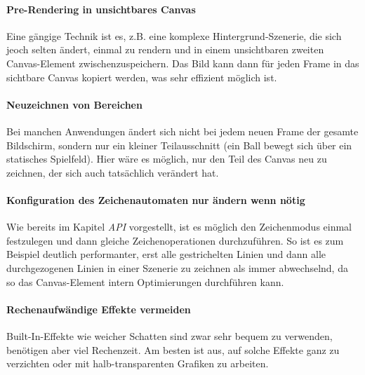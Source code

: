 \documentclass[a4paper, 12pt]{article}
\begin{document}
\paragraph{Pre-Rendering in unsichtbares Canvas} Eine gängige Technik ist es, z.B. eine komplexe Hintergrund-Szenerie, die sich jeoch selten ändert, einmal zu rendern und in einem unsichtbaren zweiten Canvas-Element zwischenzuspeichern. Das Bild kann dann für jeden Frame in das sichtbare Canvas kopiert werden, was sehr effizient möglich ist.
\paragraph{Neuzeichnen von Bereichen} Bei manchen Anwendungen ändert sich nicht bei jedem neuen Frame der gesamte Bildschirm, sondern nur ein kleiner Teilausschnitt (ein Ball bewegt sich über ein statisches Spielfeld). Hier wäre es möglich, nur den Teil des Canvas neu zu zeichnen, der sich auch tatsächlich verändert hat.
\paragraph{Konfiguration des Zeichenautomaten nur ändern wenn nötig} Wie bereits im Kapitel \emph{API} vorgestellt, ist es möglich den Zeichenmodus einmal festzulegen und dann gleiche Zeichenoperationen durchzuführen. So ist es zum Beispiel deutlich performanter, erst alle gestrichelten Linien und dann alle durchgezogenen Linien in einer Szenerie zu zeichnen als immer abwechselnd, da so das Canvas-Element intern Optimierungen durchführen kann.
\paragraph{Rechenaufwändige Effekte vermeiden} Built-In-Effekte wie weicher Schatten sind zwar sehr bequem zu verwenden, benötigen aber viel Rechenzeit. Am besten ist aus, auf solche Effekte ganz zu verzichten oder mit halb-transparenten Grafiken zu arbeiten.
\end{document}
